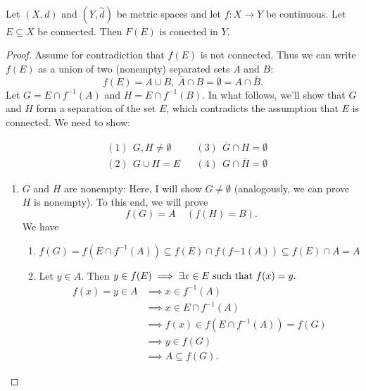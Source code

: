 \begin{theorem}  \leavevmode \\
    \label{thm4.22}
    Let $(X,d)$ and $(Y, \overset{\sim}{d})$ be metric spaces and let $f:X \to Y$ be continuous. Let $E\subseteq X$ be connected. Then $F(E)$ is conected in $Y$.
\end{theorem}

\begin{proof}
    Assume for contradiction that $f(E)$ is not connected. Thus we can write $f(E)$ as a union of two (nonempty) separated sets $A$ and $B$:
    $$f(E)= A\cup B, ~\overline{A}\cap B = \emptyset=A\cap \overline{B}.$$
    Let $G=E\cap f^{-1}(A)$ and $H=E \cap f^{-1}(B).$ In what follows, we'll show that $G$ and $H$ form a separation of the set $E$, which contradicts the assumption that $E$ is connected. We need to show:

    \begin{align*}
        &(1) ~~G, H \not = \emptyset &&(3) ~~\overline{G}\cap H = \emptyset \\
        &(2) ~~G\cup H = E &&(4) ~~G \cap \overline{H} = \emptyset
    \end{align*}

    \begin{enumerate}[$(1)$]
        \item $G$ and $H$ are nonempty: Here, I will show $G \not = \emptyset$ (analogously, we can prove $H$ is nonempty). To this end, we will prove $$f(G) = A ~~~~~\left(f(H) = B \right).$$ We have
        \begin{enumerate}[$(i)$]
            \item $f(G)=f(E\cap f^{-1}(A)) \subseteq f(E) \cap f(f{-1}(A)) \subseteq f(E) \cap A = A$
            \item Let $y\in A$. Then $y\in f(E) \implies \exists x \in E \text{ such that } f(x) = y.$
            \begin{align*}
                f(x) = y \in A &\implies x \in f^{-1}(A) \\
                &\implies x \in E \cap f^{-1}(A) \\
                &\implies f(x) \in f(E\cap f^{-1}(A)) = f(G) \\
                &\implies y \in f(G) \\
                &\implies A \subseteq f(G).
            \end{align*}
        \end{enumerate}
        

\end{enumerate}
\end{proof}
